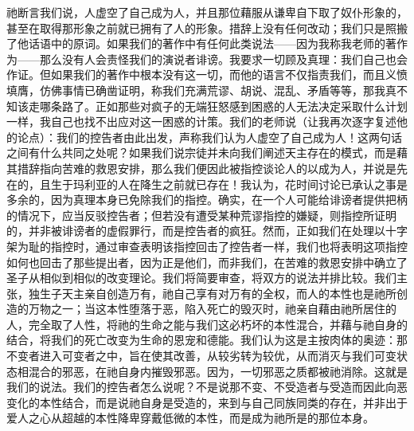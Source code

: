祂断言我们说，人虚空了自己成为人，并且那位藉服从谦卑自下取了奴仆形象的，甚至在取得那形象之前就已拥有了人的形象。措辞上没有任何改动；我们只是照搬了他话语中的原词。如果我们的著作中有任何此类说法——因为我称我老师的著作为——那么没有人会责怪我们的演说者诽谤。我要求一切顾及真理：我们自己也会作证。但如果我们的著作中根本没有这一切，而他的语言不仅指责我们，而且义愤填膺，仿佛事情已确凿证明，称我们充满荒谬、胡说、混乱、矛盾等等，那我真不知该走哪条路了。正如那些对疯子的无端狂怒感到困惑的人无法决定采取什么计划一样，我自己也找不出应对这一困惑的计策。我们的老师说（让我再次逐字复述他的论点）：我们的控告者由此出发，声称我们认为人虚空了自己成为人！这两句话之间有什么共同之处呢？如果我们说宗徒并未向我们阐述天主存在的模式，而是藉其措辞指向苦难的救恩安排，那么我们便因此被指控谈论人的以成为人，并说是先在的，且生于玛利亚的人在降生之前就已存在！我认为，花时间讨论已承认之事是多余的，因为真理本身已免除我们的指控。确实，在一个人可能给诽谤者提供把柄的情况下，应当反驳控告者；但若没有遭受某种荒谬指控的嫌疑，则指控所证明的，并非被诽谤者的虚假罪行，而是控告者的疯狂。然而，正如我们在处理以十字架为耻的指控时，通过审查表明该指控回击了控告者一样，我们也将表明这项指控如何也回击了那些提出者，因为正是他们，而非我们，在苦难的救恩安排中确立了圣子从相似到相似的改变理论。我们将简要审查，将双方的说法并排比较。我们主张，独生子天主亲自创造万有，祂自己享有对万有的全权，而人的本性也是祂所创造的万物之一；当这本性堕落于恶，陷入死亡的毁灭时，祂亲自藉由祂所居住的人，完全取了人性，将祂的生命之能与我们这必朽坏的本性混合，并藉与祂自身的结合，将我们的死亡改变为生命的恩宠和德能。我们认为这是主按肉体的奥迹：那不变者进入可变者之中，旨在使其改善，从较劣转为较优，从而消灭与我们可变状态相混合的邪恶，在祂自身内摧毁邪恶。因为，一切邪恶之质都被祂消除。这就是我们的说法。我们的控告者怎么说呢？不是说那不变、不受造者与受造而因此向恶变化的本性结合，而是说祂自身是受造的，来到与自己同族同类的存在，并非出于爱人之心从超越的本性降卑穿戴低微的本性，而是成为祂所是的那位本身。\par


